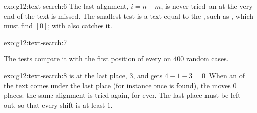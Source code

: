 \begin{solution}{exo:g12:text-search:6}
The last alignment, $i = n - m$, is never tried: an  at the very end of the text is missed. The smallest test
is a text equal to the , such as , which must find $[0]$;  with
 also catches it.
\end{solution}

\begin{solution}{exo:g12:text-search:7}
\smallskip\noindent\hspace*{2em}

\noindent\hspace*{4em}

\noindent\hspace*{4em}

\noindent\hspace*{4em}

\noindent\hspace*{6em}

\noindent\hspace*{6em}

\noindent\hspace*{8em}

\noindent\hspace*{6em}

\noindent\hspace*{8em}

\noindent\hspace*{6em}

\noindent\hspace*{4em}

\smallskip\noindent The tests compare it with the first position of every  on $400$ random cases.
\end{solution}

\begin{solution}{exo:g12:text-search:8}
 is at the last place, $3$, and gets $4 - 1 - 3 = 0$. When an  of the text comes under the last place
(for instance once  is found), the  moves $0$ places: the same alignment is tried again, for ever.
The last place must be left out, so that every shift is at least $1$.
\end{solution}

